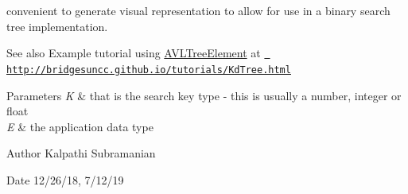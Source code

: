 convenient to generate visual representation to allow for use in a binary search tree implementation.

\begin{DoxySeeAlso}{See also}
Example tutorial using \mbox{\hyperlink{classbridges_1_1base_1_1_a_v_l_tree_element}{A\+V\+L\+Tree\+Element}} at \href{http://bridgesuncc.github.io/tutorials/KdTree.html}{\texttt{ http\+://bridgesuncc.\+github.\+io/tutorials/\+Kd\+Tree.\+html}}
\end{DoxySeeAlso}

\begin{DoxyParams}{Parameters}
{\em K} & that is the search key type -\/ this is usually a number, integer or float \\
\hline
{\em E} & the application data type\\
\hline
\end{DoxyParams}
\begin{DoxyAuthor}{Author}
Kalpathi Subramanian 
\end{DoxyAuthor}
\begin{DoxyDate}{Date}
12/26/18, 7/12/19 
\end{DoxyDate}
